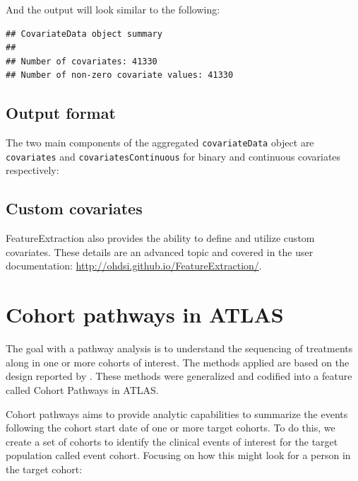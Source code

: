 \documentclass[11pt]{book}
\newenvironment{Shaded}{\begin{snugshade}}{\end{snugshade}}
\newcommand{\NormalTok}[1]{#1}
\newcommand{\OperatorTok}[1]{\textcolor[rgb]{0.81,0.36,0.00}{\textbf{#1}}}
\theoremstyle{definition}
\theoremstyle{definition}
\theoremstyle{definition}
\theoremstyle{remark}
\begin{document}
And the output will look similar to the following:

\begin{verbatim}
## CovariateData object summary 
## 
## Number of covariates: 41330 
## Number of non-zero covariate values: 41330
\end{verbatim}

\hypertarget{output-format}{%
\subsection{Output format}\label{output-format}}

The two main components of the aggregated \texttt{covariateData} object are \texttt{covariates} and \texttt{covariatesContinuous} for binary and continuous covariates respectively:

\begin{Shaded}
\end{Shaded}

\hypertarget{custom-covariates}{%
\subsection{Custom covariates}\label{custom-covariates}}

FeatureExtraction also provides the ability to define and utilize custom covariates. These details are an advanced topic and covered in the user documentation: \url{http://ohdsi.github.io/FeatureExtraction/}.

\hypertarget{cohort-pathways-in-atlas}{%
\section{Cohort pathways in ATLAS}\label{cohort-pathways-in-atlas}}

The goal with a pathway analysis is to understand the sequencing of treatments along in one or more cohorts of interest. The methods applied are based on the design reported by \citet{Hripcsak7329}. These methods were generalized and codified into a feature called Cohort Pathways in ATLAS.

Cohort pathways aims to provide analytic capabilities to summarize the events following the cohort start date of one or more target cohorts. To do this, we create a set of cohorts to identify the clinical events of interest for the target population called event cohort. Focusing on how this might look for a person in the target cohort:
\end{document}
